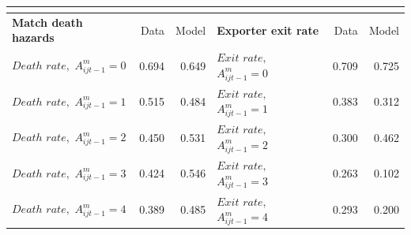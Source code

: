 \documentclass[notes=show]{beamer}
\begin{document}
\begin{frame}%


\begin{center}
{\small 
\begin{tabular}{lrrlrr}
\multicolumn{6}{c}{} \\ \hline\hline
\textbf{Match death hazards}      & Data  & Model & \textbf{Exporter exit rate}       & Data  & Model \\ \hline
$Death$ $rate,$ $A_{ijt-1}^{m}=0$ & 0.694 & 0.649 & $Exit$ $rate,$ $ A_{ijt-1}^{m}=0$ & 0.709 & 0.725 \\
$Death$ $rate,$ $A_{ijt-1}^{m}=1$ & 0.515 & 0.484 & $Exit$ $rate,$ $ A_{ijt-1}^{m}=1$ & 0.383 & 0.312 \\
$Death$ $rate,$ $A_{ijt-1}^{m}=2$ & 0.450 & 0.531 & $Exit$ $rate,$ $ A_{ijt-1}^{m}=2$ & 0.300 & 0.462 \\
$Death$ $rate,$ $A_{ijt-1}^{m}=3$ & 0.424 & 0.546 & $Exit$ $rate,$ $ A_{ijt-1}^{m}=3$ & 0.263 & 0.102 \\
$Death$ $rate,$ $A_{ijt-1}^{m}=4$ & 0.389 & 0.485 & $Exit$ $rate,$ $ A_{ijt-1}^{m}=4$ & 0.293 & 0.200 \\ \hline
\end{tabular}%
}
\end{center}

\end{frame}%
\end{document}
